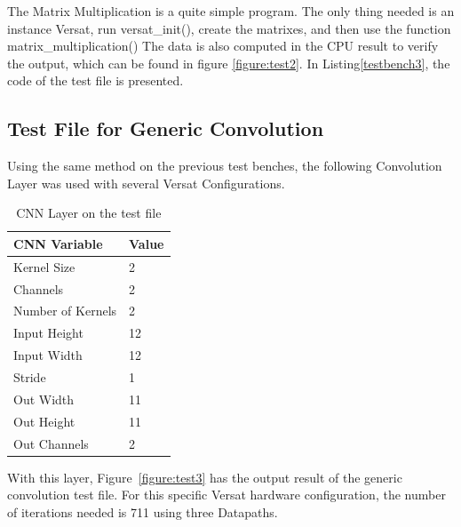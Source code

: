 The Matrix Multiplication is a quite simple program. The only thing needed is an instance
Versat, run versat\_init(), create the matrixes, and then use the function matrix\_multiplication()
The data is also computed in the CPU result to verify the output, which can be found in
figure \ref{figure:test2}. In Listing\ref{testbench3}, the code of the test file is presented.




\subsection{Test File for Generic Convolution}

Using the same method on the previous test benches, the following Convolution Layer was used
with several Versat Configurations.

\begin{table}[!htpb]
    \centering
    \begin{tabular}{ll}
    \hline
    \textbf{CNN Variable} & \textbf{Value}        \\ \hline
    Kernel Size            & 2                 \\
    Channels            & 2                       \\
    Number of Kernels            & 2                       \\
    Input Height                  & 12                        \\
    Input Width                & 12                  \\
    Stride              & 1                     \\
    Out Width               & 11                      \\
    Out Height            & 11  \\
    Out Channels                   & 2                     \\ \hline
    \end{tabular}
    \label{table:convInput}
    \caption{CNN Layer on the test file}
\end{table}

With this layer, Figure~\ref{figure:test3} has the output result of the generic convolution test file.
For this specific Versat hardware configuration, the number of iterations needed is 711 using three  Datapaths.


